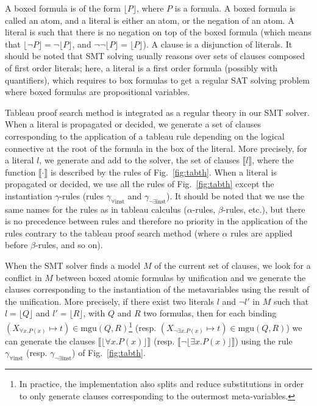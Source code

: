A boxed formula is of the form $\lfloor{}P\rfloor$, where $P$ is a formula. A
boxed formula is called an atom, and a literal is either an atom, or the negation
of an atom. A literal is such that there is no negation on top of the boxed
formula (which means that $\lfloor\neg{}P\rfloor=\neg\lfloor{}P\rfloor$, and
$\neg\neg\lfloor{}P\rfloor=\lfloor{}P\rfloor$). A clause is a disjunction of
literals. It should be noted that SMT solving usually reasons over sets of
clauses composed of first order literals; here, a literal is a first order
formula (possibly with quantifiers), which requires to box formulas to get a
regular SAT solving problem where boxed formulas are propositional variables.

Tableau proof search method is integrated as a regular theory in our SMT solver.
When a literal is propagated or decided, we
generate a set of clauses corresponding to the application of a tableau rule
depending on the logical connective at the root of the formula in the box of the
literal. More precisely, for a literal $l$, we generate and add to the solver,
the set of clauses $\llbracket{}l\rrbracket$, where the function
$\llbracket\cdot\rrbracket$ is
described by the rules of Fig.~\ref{fig:tabth}. When a literal is propagated or
decided, we use all the rules of Fig.~\ref{fig:tabth} except the instantiation
$\gamma$-rules (rules $\gamma_{\forall\mathrm{inst}}$ and
$\gamma_{\neg\exists\mathrm{inst}}$). It should be noted that we use the same
names for the rules as in tableau calculus ($\alpha$-rules, $\beta$-rules,
etc.), but there is no precedence between rules and therefore no priority in the
application of the rules contrary to the tableau proof search method (where
$\alpha$ rules are applied before $\beta$-rules, and so on).

When the SMT solver finds a model $M$ of the current set of clauses,
we look for a conflict in $M$ between boxed atomic formulas by unification and we
generate the clauses corresponding to the instantiation of the metavariables
using the result of the unification. More precisely, if there exist two literals
$l$ and $\neg{}l'$ in $M$ such that $l=\lfloor{}Q\rfloor$ and
$l'=\lfloor{}R\rfloor$, with $Q$ and $R$ two formulas, then for each binding
$(X_{\forall{}x.P(x)}\mapsto{}t)\in\mathrm{mgu}(Q,R)$\footnote{In practice,
the implementation also splits and reduce substitutions in order to only generate
clauses corresponding to the outermost meta-variables.}
(resp.
$(X_{\neg\exists{}x.P(x)}\mapsto{}t)\in\mathrm{mgu}(Q,R)$)
we can generate the clauses $\llbracket\lfloor\forall{}x.P(x)\rfloor{}\rrbracket$
(resp. $\llbracket\neg\lfloor\exists{}x.P(x)\rfloor{}\rrbracket$) using the rule
$\gamma_{\forall\mathrm{inst}}$ (resp. $\gamma_{\neg\exists\mathrm{inst}}$) of
Fig.~\ref{fig:tabth}.

